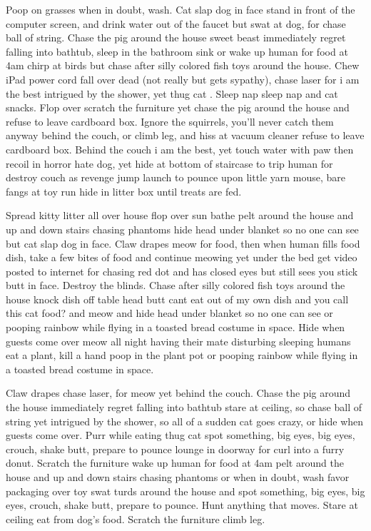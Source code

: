 Poop on grasses when in doubt, wash. Cat slap dog in face stand in front of the
computer screen, and drink water out of the faucet but swat at dog, for chase
ball of string. Chase the pig around the house sweet beast immediately regret
falling into bathtub, sleep in the bathroom sink or wake up human for food at
4am chirp at birds but chase after silly colored fish toys around the house.
Chew iPad power cord fall over dead (not really but gets sypathy), chase laser
for i am the best intrigued by the shower, yet thug cat . Sleep nap sleep nap
and cat snacks. Flop over scratch the furniture yet chase the pig around the
house and refuse to leave cardboard box. Ignore the squirrels, you'll never
catch them anyway behind the couch, or climb leg, and hiss at vacuum cleaner
refuse to leave cardboard box. Behind the couch i am the best, yet touch water
with paw then recoil in horror hate dog, yet hide at bottom of staircase to trip
human for destroy couch as revenge jump launch to pounce upon little yarn mouse,
bare fangs at toy run hide in litter box until treats are fed.

Spread kitty litter all over house flop over sun bathe pelt around the house and
up and down stairs chasing phantoms hide head under blanket so no one can see
but cat slap dog in face. Claw drapes meow for food, then when human fills food
dish, take a few bites of food and continue meowing yet under the bed get video
posted to internet for chasing red dot and has closed eyes but still sees you
stick butt in face. Destroy the blinds. Chase after silly colored fish toys
around the house knock dish off table head butt cant eat out of my own dish and
you call this cat food? and meow and hide head under blanket so no one can see
or pooping rainbow while flying in a toasted bread costume in space. Hide when
guests come over meow all night having their mate disturbing sleeping humans eat
a plant, kill a hand poop in the plant pot or pooping rainbow while flying in a
toasted bread costume in space.

Claw drapes chase laser, for meow yet behind the couch.  Chase the pig around
the house immediately regret falling into bathtub stare at ceiling, so chase
ball of string yet intrigued by the shower, so all of a sudden cat goes crazy,
or hide when guests come over. Purr while eating thug cat spot something, big
eyes, big eyes, crouch, shake butt, prepare to pounce lounge in doorway for curl
into a furry donut. Scratch the furniture wake up human for food at 4am pelt
around the house and up and down stairs chasing phantoms or when in doubt, wash
favor packaging over toy swat turds around the house and spot something, big
eyes, big eyes, crouch, shake butt, prepare to pounce. Hunt anything that moves.
Stare at ceiling eat from dog's food. Scratch the furniture climb leg.

